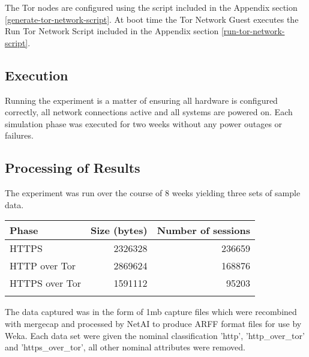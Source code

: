 The Tor nodes are configured using the script included in the Appendix section
\ref{generate-tor-network-script}. At boot time the Tor Network Guest executes
the Run Tor Network Script included in the Appendix section
\ref{run-tor-network-script}.

\subsection{Execution}

Running the experiment is a matter of ensuring all hardware is configured
correctly, all network connections active and all systems are powered on. Each
simulation phase was executed for two weeks without any power outages or
failures.

\subsection{Processing of Results}

The experiment was run over the course of 8 weeks yielding three sets of sample
data.

\begin{tabular}{lrr}
  \toprule
  Phase & Size (bytes) & Number of sessions\\
  \midrule
  HTTPS & 2326328 & 236659\\
  HTTP over Tor & 2869624 & 168876\\
  HTTPS over Tor & 1591112 & 95203\\
  \bottomrule
  \label{table:datasets}
\end{tabular}

The data captured was in the form of 1mb capture files which were recombined
with mergecap and processed by NetAI to produce ARFF format files for use by
Weka. Each data set were given the nominal classification 'http',
'http\_over\_tor' and 'https\_over\_tor', all other nominal attributes were
removed.

